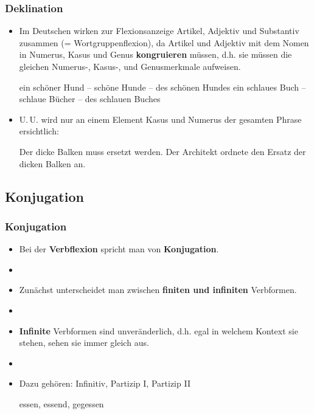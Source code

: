 
\begin{frame}
\frametitle{Deklination}

\begin{itemize}
	\item Im Deutschen wirken zur Flexionsanzeige Artikel, Adjektiv und Substantiv zusammen (= Wortgruppenflexion), da Artikel und Adjektiv mit dem Nomen in Numerus, Kasus und Genus \textbf{kongruieren} müssen, d.h. sie müssen die gleichen Numerus-, Kasus-, und Genusmerkmale aufweisen.
	
	\eal 
	\ex ein schöner Hund -- schöne Hunde -- des schönen Hundes
	\ex ein schlaues Buch -- schlaue Bücher -- des schlauen Buches
	\zl
	
	\item U.\,U. wird nur an einem Element Kasus und Numerus der gesamten Phrase ersichtlich:
	
	\eal 
	\ex Der dicke Balken muss ersetzt werden.
	\ex Der Architekt ordnete den Ersatz der dicken Balken an.
	\zl
	
\end{itemize}


\end{frame}


\subsection{Konjugation}



\begin{frame}
\frametitle{Konjugation}

\begin{itemize}
	\item Bei der \textbf{Verbflexion} spricht man von \textbf{Konjugation}.
	\item[]
	\item Zunächst unterscheidet man zwischen \textbf{finiten und infiniten} Verbformen.
	\item[]
	\item \textbf{Infinite} Verbformen sind unveränderlich, d.h. egal in welchem Kontext sie stehen, sehen sie immer gleich aus.
	\item[]
	\item Dazu gehören: Infinitiv, Partizip I, Partizip II
	
	\ea essen, essend, gegessen
	\z
	
\end{itemize}


\end{frame}



